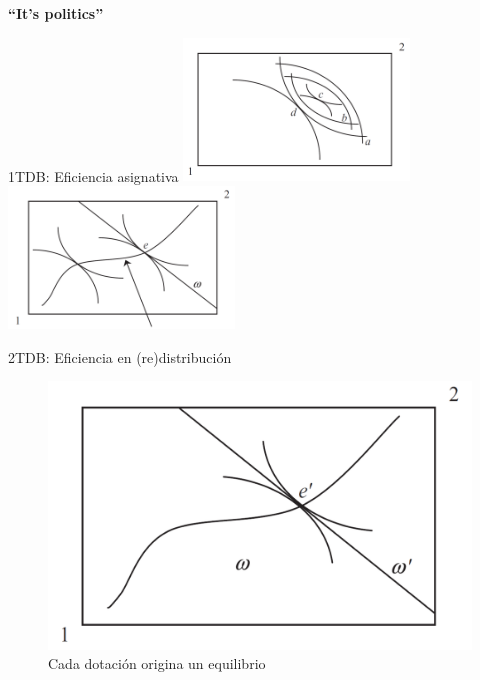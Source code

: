 \documentclass[
  ignorenonframetext,
]{beamer}
\begin{document}
\begin{frame}{\textbf{``It's politics''}}
\begin{block}{1TDB: Eficiencia asignativa}
\protect\hypertarget{tdb-eficiencia-asignativa}{}
\includegraphics[width=0.45\textwidth,height=\textheight]{../epol/fig/fig-01-006.png}
\includegraphics[width=0.45\textwidth,height=\textheight]{../epol/fig/fig-01-007.png}
\end{block}

\begin{block}{2TDB: Eficiencia en (re)distribución}
\protect\hypertarget{tdb-eficiencia-en-redistribuciuxf3n}{}
\begin{figure}

{\centering \includegraphics{../epol/fig/fig-01-008.png}

}

\caption{Cada dotación origina un equilibrio}

\end{figure}
\end{block}


\end{frame}
\end{document}
